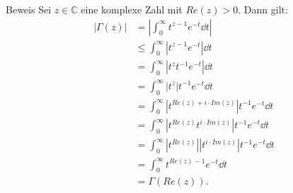 \documentclass[10pt]{beamer}
\def\bC{\mathbb{C}}
\begin{document}
\begin{frame}{Beweis}
    Sei \( z \in \bC \) eine komplexe Zahl mit \( Re(z) > 0 \). Dann gilt:
    \begin{align*}
        \left\vert \Gamma( z ) \right\vert
        & = \left\vert \int_{0}^{\infty} t^{z - 1} e^{-t} \dd{t} \right\vert \\
        & \leq \int_{0}^{\infty} \left\vert t^{z - 1} e^{-t} \right\vert \dd{t} \\
        & = \int_{0}^{\infty} \left\vert t^{z}t^{-1} e^{-t} \right\vert \dd{t} \\
        & = \int_{0}^{\infty} \left\vert t^{z} \right\vert t^{-1} e^{-t} \dd{t} \\
        & = \int_{0}^{\infty} \left\vert t^{Re(z) + i \cdot Im(z)} \right\vert t^{-1} e^{-t} \dd{t} \\
        & = \int_{0}^{\infty} \left\vert t^{Re(z)} t^{i \cdot Im(z)} \right\vert t^{-1} e^{-t} \dd{t} \\
        & = \int_{0}^{\infty} \left\vert t^{Re(z)} \right\vert \left\vert t^{i \cdot Im(z)} \right\vert t^{-1} e^{-t} \dd{t} \\
        & = \int_{0}^{\infty} t^{Re(z) - 1} e^{-t} \dd{t} \\
        & = \Gamma( Re( z ) ).
    \end{align*}
\end{frame}
\end{document}
